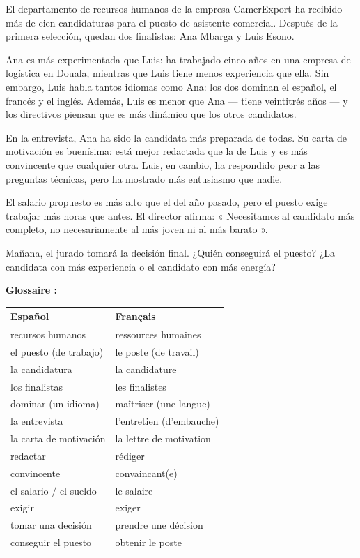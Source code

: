 \documentclass[11pt]{article}
\begin{document}
\begin{textebox}
El departamento de recursos humanos de la empresa CamerExport ha recibido más de cien candidaturas para el puesto de asistente comercial. Después de la primera selección, quedan dos finalistas: Ana Mbarga y Luis Esono.

Ana es más experimentada que Luis: ha trabajado cinco años en una empresa de logística en Douala, mientras que Luis tiene menos experiencia que ella. Sin embargo, Luis habla tantos idiomas como Ana: los dos dominan el español, el francés y el inglés. Además, Luis es menor que Ana — tiene veintitrés años — y los directivos piensan que es más dinámico que los otros candidatos.

En la entrevista, Ana ha sido la candidata más preparada de todas. Su carta de motivación es buenísima: está mejor redactada que la de Luis y es más convincente que cualquier otra. Luis, en cambio, ha respondido peor a las preguntas técnicas, pero ha mostrado más entusiasmo que nadie.

El salario propuesto es más alto que el del año pasado, pero el puesto exige trabajar más horas que antes. El director afirma: « Necesitamos al candidato más completo, no necesariamente al más joven ni al más barato ».

Mañana, el jurado tomará la decisión final. ¿Quién conseguirá el puesto? ¿La candidata con más experiencia o el candidato con más energía?
\end{textebox}

\textbf{Glossaire :}

\begin{center}
\begin{tabularx}{\linewidth}{|X|X|}
\hline
\rowcolor{popblueL} \textbf{Español} & \textbf{Français} \\
\hline
recursos humanos & ressources humaines \\
\hline
el puesto (de trabajo) & le poste (de travail) \\
\hline
la candidatura & la candidature \\
\hline
los finalistas & les finalistes \\
\hline
dominar (un idioma) & maîtriser (une langue) \\
\hline
la entrevista & l'entretien (d'embauche) \\
\hline
la carta de motivación & la lettre de motivation \\
\hline
redactar & rédiger \\
\hline
convincente & convaincant(e) \\
\hline
el salario / el sueldo & le salaire \\
\hline
exigir & exiger \\
\hline
tomar una decisión & prendre une décision \\
\hline
conseguir el puesto & obtenir le poste \\
\hline
\end{tabularx}
\end{center}
\end{document}

